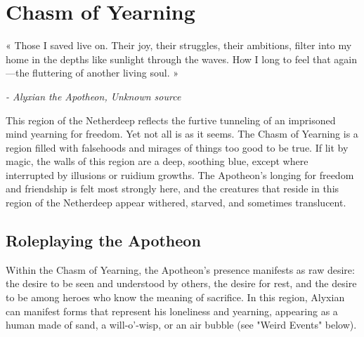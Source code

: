 \documentclass[10pt,a4,twoside,twocolumn,openany,nodeprecatedcode]{dndbook}
\begin{document}
\section{Chasm of Yearning}
\begingroup
\DndSetThemeColor[DmgLavender]\begin{DndSidebar}{}
\Large \centering «
\large \centering Those I saved live on. Their joy, their struggles, their ambitions, filter into my home in the depths like sunlight through the waves. How I long to feel that again—the fluttering of another living soul.
\Large »
 
 \normalsize \raggedleft \textit{ - Alyxian the Apotheon, Unknown source}
\end{DndSidebar}
\endgroup
This region of the Netherdeep reflects the furtive tunneling of an imprisoned mind yearning for freedom. Yet not all is as it seems. The Chasm of Yearning is a region filled with falsehoods and mirages of things too good to be true. If lit by magic, the walls of this region are a deep, soothing blue, except where interrupted by illusions or ruidium growths.
The Apotheon's longing for freedom and friendship is felt most strongly here, and the creatures that reside in this region of the Netherdeep appear withered, starved, and sometimes translucent.
\subsection{Roleplaying the Apotheon}
Within the Chasm of Yearning, the Apotheon's presence manifests as raw desire: the desire to be seen and understood by others, the desire for rest, and the desire to be among heroes who know the meaning of sacrifice. In this region, Alyxian can manifest forms that represent his loneliness and yearning, appearing as a human made of sand, a will-o'-wisp, or an air bubble (see "Weird Events" below).
\end{document}
